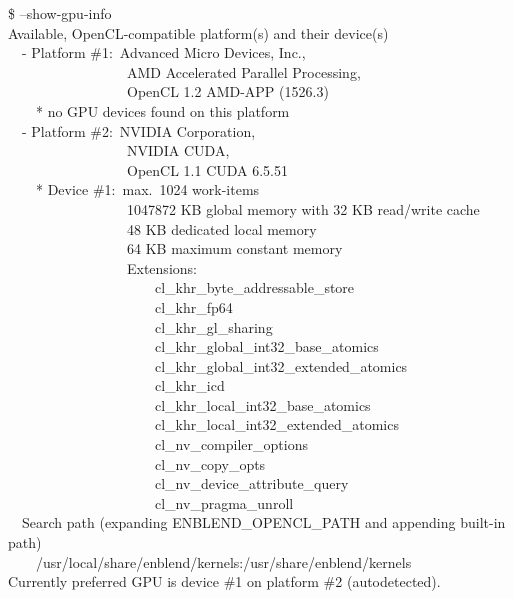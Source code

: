 \begin{codelist}
  \begin{exemplar}
    \begin{maxipage}
      \begin{terminal}
        \$ \app{} --show-gpu-info \\
        Available, OpenCL-compatible platform(s) and their device(s) \\
        ~~- Platform \#1:~Advanced Micro Devices, Inc., \\
        ~~~~~~~~~~~~~~~~~AMD Accelerated Parallel Processing, \\
        ~~~~~~~~~~~~~~~~~OpenCL 1.2 AMD-APP (1526.3) \\
        ~~~~* no GPU devices found on this platform \\
        ~~- Platform \#2:~NVIDIA Corporation, \\
        ~~~~~~~~~~~~~~~~~NVIDIA CUDA, \\
        ~~~~~~~~~~~~~~~~~OpenCL 1.1 CUDA 6.5.51 \\
        ~~~~* Device \#1:~max.~1024 work-items \\
        ~~~~~~~~~~~~~~~~~1047872 KB global memory with 32 KB read/write cache \\
        ~~~~~~~~~~~~~~~~~48 KB dedicated local memory \\
        ~~~~~~~~~~~~~~~~~64 KB maximum constant memory \\
        ~~~~~~~~~~~~~~~~~Extensions: \\
        ~~~~~~~~~~~~~~~~~~~~~cl\_khr\_byte\_addressable\_store \\
        ~~~~~~~~~~~~~~~~~~~~~cl\_khr\_fp64 \\
        ~~~~~~~~~~~~~~~~~~~~~cl\_khr\_gl\_sharing \\
        ~~~~~~~~~~~~~~~~~~~~~cl\_khr\_global\_int32\_base\_atomics \\
        ~~~~~~~~~~~~~~~~~~~~~cl\_khr\_global\_int32\_extended\_atomics \\
        ~~~~~~~~~~~~~~~~~~~~~cl\_khr\_icd \\
        ~~~~~~~~~~~~~~~~~~~~~cl\_khr\_local\_int32\_base\_atomics \\
        ~~~~~~~~~~~~~~~~~~~~~cl\_khr\_local\_int32\_extended\_atomics \\
        ~~~~~~~~~~~~~~~~~~~~~cl\_nv\_compiler\_options \\
        ~~~~~~~~~~~~~~~~~~~~~cl\_nv\_copy\_opts \\
        ~~~~~~~~~~~~~~~~~~~~~cl\_nv\_device\_attribute\_query \\
        ~~~~~~~~~~~~~~~~~~~~~cl\_nv\_pragma\_unroll \\
        ~~Search path (expanding ENBLEND\_OPENCL\_PATH and appending built-in path) \\
        ~~~~/usr/local/share/enblend/kernels:/usr/share/enblend/kernels \\
        Currently preferred GPU is device \#1 on platform \#2 (autodetected).
      \end{terminal}
    \end{maxipage}


\end{exemplar}
\end{codelist}
